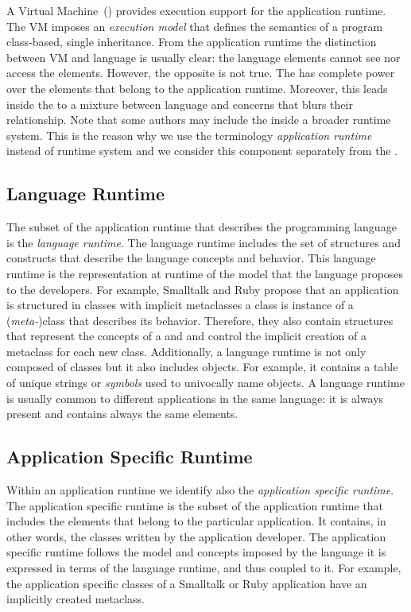 A Virtual Machine~(\VM) provides execution support for the application runtime. The VM imposes an \emph{execution model} that defines the semantics of a program \eg class-based, single inheritance. From the application runtime the distinction between VM and language is usually clear: the language elements cannot see nor access the \VM elements. However, the opposite is not true. The \VM has complete power over the elements that belong to the application runtime. Moreover, this leads inside the \VM to a mixture between language and \VM concerns that blurs their relationship.
Note that some authors may include the \VM inside a broader runtime system.
This is the reason why we use the terminology \emph{application runtime} instead of runtime system and we consider this component separately from the \VM.

\subsection{Language Runtime}

The subset of the application runtime that describes the programming language is the \emph{language runtime}. The language runtime includes the set of structures and constructs that describe the language concepts and behavior. This language runtime is the representation at runtime of the model that the language proposes to the developers. For example, Smalltalk and Ruby propose that an application is structured in classes with implicit metaclasses \ie a class is instance of a (\emph{meta-})class that describes its behavior. Therefore, they also contain structures that represent the concepts of a  and  and control the implicit creation of a metaclass for each new class. Additionally, a language runtime is not only composed of classes but it also includes objects. For example, it contains a table of unique strings or \emph{symbols} used to univocally name objects. A language runtime is usually common to different applications in the same language: it is always present and contains always the same elements.

\subsection{Application Specific Runtime}

Within an application runtime we identify also the \emph{application specific runtime}. The application specific runtime is the subset of the application runtime that includes the elements that belong to the particular application. It contains, in other words, the classes written by the application developer. The application specific runtime follows the model and concepts imposed by the language \ie it is expressed in terms of the language runtime, and thus coupled to it. For example, the application specific classes of a Smalltalk or Ruby application have an implicitly created metaclass.

